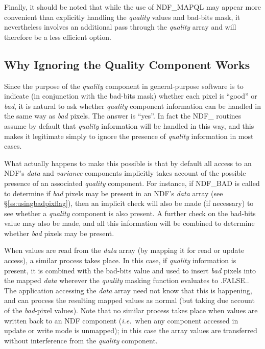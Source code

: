 \documentclass[twoside,11pt]{article}
\newcommand{\htmlref}[2]{#1}
\newcommand{\xlabel}[1]{}
\newcommand{\st}[1]{{\em{#1}}}
\begin{document}
Finally, it should be noted that while the use of NDF\_MAPQL may appear more
convenient than explicitly handling the \st{quality\/} values and bad-bits
mask, it nevertheless involves an additional pass through the \st{quality\/}
array and will therefore be a less efficient option. 

\subsection{\xlabel{why_ignoring_the_quality_component_works}Why Ignoring the Quality Component Works}

Since the purpose of the \st{quality\/} component in general-purpose software is
to indicate (in conjunction with the bad-bits mask) whether each pixel is
``good'' or \st{bad}, it is natural to ask whether \st{quality\/} component 
information can be handled in the same way as \st{bad\/} pixels.
The answer is ``yes''.
In fact the NDF\_ routines assume by default that \st{quality\/} information
will be handled in this way, and this makes it legitimate simply to ignore
the presence of \st{quality\/} information in most cases. 

What actually happens to make this possible is that by default all access to
an NDF's \st{data\/} and \st{variance\/} components implicitly takes account
of the possible  presence of an associated \st{quality\/} component. 
For instance, if \htmlref{NDF\_BAD}{NDF_BAD} is called to determine if \st{bad\/} pixels may be
present in an NDF's \st{data\/} array (see \S\ref{ss:usingbadpixflag}), then an
implicit check will also be made (if necessary) to see whether a \st{quality\/}
component is also present. 
A further check on the bad-bits value may also be made, and all this
information will be combined to determine whether \st{bad\/} pixels may be
present. 

When values are read from the \st{data\/} array (by mapping it for read or update 
access), a similar process takes place.
In this case, if \st{quality\/} information is present, it is combined with the 
bad-bits value and used to insert \st{bad\/} pixels into the mapped \st{data\/}
wherever the \st{quality\/} masking function evaluates to .FALSE..
The application accessing the \st{data\/} array need not know that this is
happening, and can process the resulting mapped values as normal (but taking
due account of the \st{bad\/}-pixel values). 
Note that no similar process takes place when values are written back to an
NDF component (\st{i.e.}\ when any component accessed in update or write
mode is unmapped); in this case the array values are transferred without
interference from the \st{quality\/} component.
\end{document}
